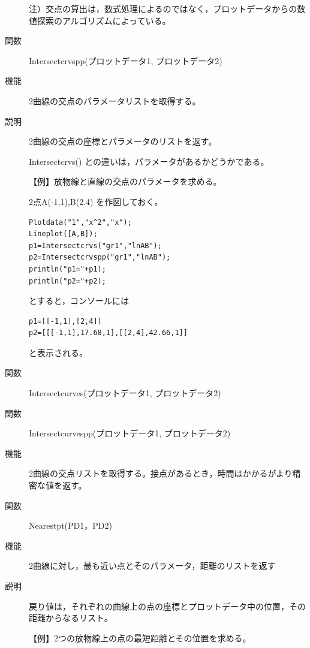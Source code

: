 \documentclass[papersize,a4paper,12pt,uplatex]{jsarticle}
\begin{document}
\begin{description}
\vspace{\baselineskip}
注）交点の算出は，数式処理によるのではなく，プロットデータからの数値探索のアルゴリズムによっている。

\vspace{\baselineskip}

\hypertarget{intersectcrvspp}{}
\item[関数]Intersectcrvspp(プロットデータ1, プロットデータ2)
\item[機能]2曲線の交点のパラメータリストを取得する。
\item[説明]2曲線の交点の座標とパラメータのリストを返す。

Intersectcrvs() との違いは，パラメータがあるかどうかである。

\vspace{\baselineskip}
【例】放物線と直線の交点のパラメータを求める。

2点A(-1,1),B(2.4) を作図しておく。
\begin{verbatim}
Plotdata("1","x^2","x");
Lineplot([A,B]);
p1=Intersectcrvs("gr1","lnAB");
p2=Intersectcrvspp("gr1","lnAB");
println("p1="+p1);
println("p2="+p2);
\end{verbatim}
とすると，コンソールには
\begin{verbatim}
p1=[[-1,1],[2,4]] 
p2=[[[-1,1],17.68,1],[[2,4],42.66,1]]
\end{verbatim}
と表示される。
\vspace{\baselineskip}

\hypertarget{intersectcurves}{}
\item[関数]Intersectcurves(プロットデータ1, プロットデータ2)
\item[関数]Intersectcurvespp(プロットデータ1, プロットデータ2)
\item[機能]2曲線の交点リストを取得する。接点があるとき，時間はかかるがより精密な値を返す。

\vspace{\baselineskip}

\hypertarget{nearestpt}{}
\item[関数]Nearestpt(PD1，PD2)
\item[機能]2曲線に対し，最も近い点とそのパラメータ，距離のリストを返す
\item[説明]戻り値は，それぞれの曲線上の点の座標とプロットデータ中の位置，その距離からなるリスト。

\vspace{\baselineskip}
【例】2つの放物線上の点の最短距離とその位置を求める。


\end{description}
\end{document}
